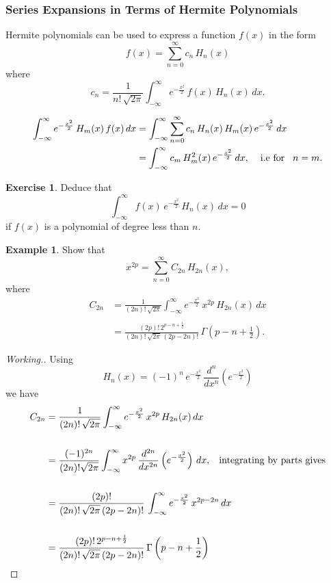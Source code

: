 \documentclass[12pt,a4paper]{report}
\theoremstyle{definition}
\newtheorem{exa}[thm]{Example}
\newtheorem{exe}[thm]{Exercise}
\theoremstyle{plain}
\begin{document}
\subsubsection{Series Expansions in Terms of Hermite Polynomials}
Hermite polynomials can be used to express a function $f(x)$ in the form
$$f(x) = \sum_{n=0}^{\infty}c_n\, H_n(x)$$ where 
$$c_n = \frac{1}{n!\, \sqrt{2\pi}}\int_{-\infty}^{\infty} e^{-\frac{x^2}{2}}\, f(x)\, H_n(x)\, dx.$$

\begin{align*}
\int_{-\infty}^{\infty} e^{-\frac{x^2}{2}}\, H_m(x)\, f(x)\, dx & = \int_{-\infty}^{\infty}\sum_{n = 0}^{\infty} c_n\, H_n(x)\, H_m(x)\, e^{-\frac{x^2}{2}}\, dx\\
& = \int_{-\infty}^{\infty} c_m\, H_m^2(x)\, e^{-\frac{x^2}{2}}\, dx, \hspace{0.4cm} \text{i.e for}\hspace{0.3cm} n = m.
\end{align*}


\begin{exe}
Deduce that 
$$\int_{-\infty}^{\infty} f(x)\, e^{-\frac{x^2}{2}}\, H_n(x)\, dx = 0$$ if $f(x)$ is a polynomial of degree less than $n$.
\end{exe}



\begin{exa}
Show that $$x^{2p} = \sum_{n=0}^{\infty} C_{2n}\, H_{2n}(x),$$ where 
\begin{align*}
C_{2n} & = \frac{1}{(2n)!\, \sqrt{2\pi}}\int_{-\infty}^{\infty}e^{-\frac{x^2}{2}}\, x^{2p}\, H_{2n}(x)\, dx\\\\
       & = \frac{(2p)!\, 2^{p-n + \frac{1}{2}}}{(2n)!\, \sqrt{2\pi}\, (2p-2n)!}\, \Gamma\left(p-n+\frac{1}{2}\right).
\end{align*}
\end{exa}



\begin{proof}[Working.]
Using $$H_n(x) = (-1)^n\, e^{-\frac{x^2}{2}}\, \frac{d^n}{dx^n}\left(e^{-\frac{x^2}{2}}\right)$$
we have 
\begin{align*}
C_{2n} & = \frac{1}{(2n)!\, \sqrt{2\pi}}\int_{-\infty}^{\infty} e^{-\frac{x^2}{2}}\, x^{2p}\, H_{2n}(x)\, dx\\\\
& = \frac{(-1)^{2n}}{(2n)!\sqrt{2\pi}}\int_{-\infty}^{\infty} x^{2p}\, \frac{d^{2n}}{dx^{2n}}\left(e^{-\frac{x^2}{2}}\right)\, dx, \hspace{0.3cm} \text{integrating by parts gives}\\\\
& = \frac{(2p)!}{(2n)!\, \sqrt{2\pi}\, (2p-2n)!}\, \int_{-\infty}^{\infty} e^{-\frac{x^2}{2}}\, x^{2p-2n}\, dx\\\\
& = \frac{(2p)!\, 2^{p - n + \frac{1}{2}}}{(2n)!\, \sqrt{2\pi}\, (2p-2n)!}\, \Gamma\left(p-n+\frac{1}{2}\right)
\end{align*}
\end{proof}
\end{document}
